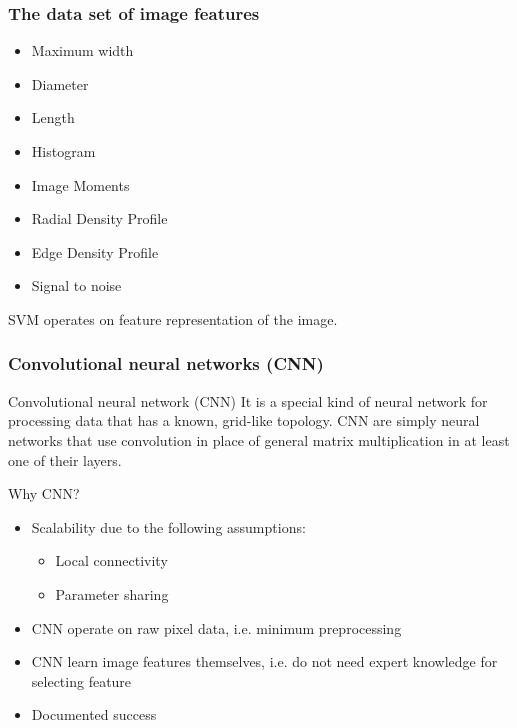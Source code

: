 \documentclass{beamer}
\begin{document}
\begin{frame}
\frametitle{The data set of image features}

\begin{itemize}
\item Maximum width
\item Diameter
\item Length
\item Histogram
\item Image Moments 
\item Radial Density Profile
\item Edge Density Profile
\item Signal to noise
\end{itemize}

\begin{block}{}
SVM operates on feature representation of the image.
\end{block}
\end{frame}

%
%

\begin{frame}
\frametitle{Convolutional neural networks (CNN)}
\begin{block}{Convolutional neural network (CNN)}
It is a special kind of neural network for processing data that has a known, grid-like topology. CNN are simply neural networks that use convolution in place of general matrix multiplication in at least one of their layers.
\end{block}

Why CNN?
\begin{itemize}
\item Scalability due to the following assumptions:
\begin{itemize}
\item Local connectivity
\item Parameter sharing
\end{itemize}
\item CNN operate on raw pixel data, i.e. minimum preprocessing
\item CNN learn image features themselves, i.e. do not need expert knowledge for selecting feature
\item Documented success
\end{itemize}
\end{frame}
\end{document}
